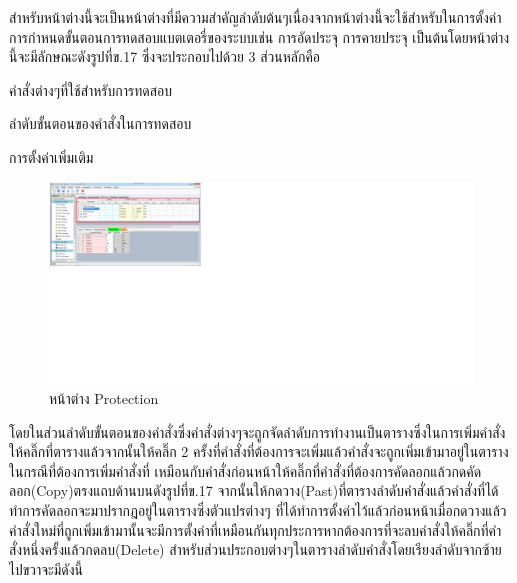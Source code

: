 \newline \hspace*{2cm}
สำหรับหน้าต่างนี้จะเป็นหน้าต่างที่มีความสำคัญลำดับต้นๆเนื่องจากหน้าต่างนี้จะใช้สำหรับในการตั้งค่าการกำหนดขั้นตอนการทดสอบแบตเตอรี่ของระบบเช่น การอัดประจุ การคายประจุ เป็นต้นโดยหน้าต่างนี้จะมีลักษณะดังรูปที่ข.17
ซึ่งจะประกอบไปด้วย 3 ส่วนหลักคือ 
\begin{itemize}
{\item คำสั่งต่างๆที่ใช้สำหรับการทดสอบ}
{\item ลำดับขั้นตอนของคำสั่งในการทดสอบ}
{\item การตั้งค่าเพิ่มเติม}
\end{itemize}
\begin{center}
	\begin{figure}[H]
		\includegraphics[width=1\linewidth]{Chapters/img/17020_Program/Recipe_Editor/UUT_tesing_page.png}
		\centering
		\captionsetup{justification=centering,margin=2cm}
		\caption{หน้าต่าง Protection}
	\end{figure}
\end{center}
โดยในส่วนลำดับขั้นตอนของคำสั่งซึ่งคำสั่งต่างๆจะถูกจัดลำดับการทำงานเป็นตารางซึ่งในการเพิ่มคำสั่งให้คลิ๊กที่ตารางแล้วจากนั้นให้คลิ๊ก 2 ครั้งที่คำสั่งที่ต้องการจะเพิ่มแล้วคำสั่งจะถูกเพิ่มเข้ามาอยู่ในตารางในกรณีที่ต้องการเพิ่มคำสั่งที่
เหมือนกับคำสั่งก่อนหน้าให้คลิ๊กที่คำสั่งที่ต้องการคัดลอกแล้วกดคัดลอก(Copy)ตรงแถบด้านบนดังรูปที่ข.17 จากนั้นให้กดวาง(Past)ที่ตารางลำดับคำสั่งแล้วคำสั่งที่ได้ทำการคัดลอกจะมาปรากฎอยู่ในตารางซึ่งตัวแปรต่างๆ
ที่ได้ทำการตั้งค่าไว้แล้วก่อนหน้าเมื่อกดวางแล้วคำสั่งใหม่ที่ถูกเพิ่มเข้ามานั้นจะมีการตั้งค่าที่เหมือนกันทุกประการหากต้องการที่จะลบคำสั่งให้คลิ๊กที่คำสั่งหนึ่งครั้งแล้วกดลบ(Delete) 
\newline \hspace*{2cm}
สำหรับส่วนประกอบต่างๆในตารางลำดับคำสั่งโดยเรียงลำดับจากซ้ายไปขวาจะมีดังนี้
